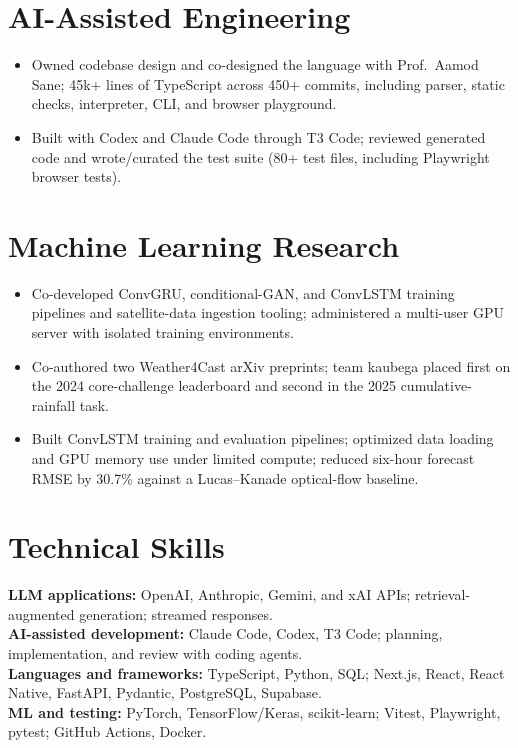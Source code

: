 \section{AI-Assisted Engineering}
\begin{itemize}
  \item Owned codebase design and co-designed the language with Prof.\ Aamod Sane; 45k+ lines of TypeScript across 450+ commits, including parser, static checks, interpreter, CLI, and browser playground.
  \item Built with Codex and Claude Code through T3 Code; reviewed generated code and wrote/curated the test suite (80+ test files, including Playwright browser tests).
\end{itemize}
\section{Machine Learning Research}
\begin{itemize}
  \item Co-developed ConvGRU, conditional-GAN, and ConvLSTM training pipelines and satellite-data ingestion tooling; administered a multi-user GPU server with isolated training environments.
  \item Co-authored two Weather4Cast arXiv preprints; team kaubega placed first on the 2024 core-challenge leaderboard and second in the 2025 cumulative-rainfall task.
\end{itemize}
\begin{itemize}
  \item Built ConvLSTM training and evaluation pipelines; optimized data loading and GPU memory use under limited compute; reduced six-hour forecast RMSE by 30.7\% against a Lucas--Kanade optical-flow baseline.
\end{itemize}
\section{Technical Skills}
\textbf{LLM applications:} OpenAI, Anthropic, Gemini, and xAI APIs; retrieval-augmented generation; streamed responses.\\
\textbf{AI-assisted development:} Claude Code, Codex, T3 Code; planning, implementation, and review with coding agents.\\
\textbf{Languages and frameworks:} TypeScript, Python, SQL; Next.js, React, React Native, FastAPI, Pydantic, PostgreSQL, Supabase.\\
\textbf{ML and testing:} PyTorch, TensorFlow/Keras, scikit-learn; Vitest, Playwright, pytest; GitHub Actions, Docker.

